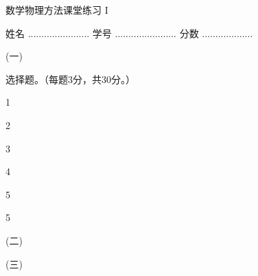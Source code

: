 \documentclass[12pt,CJK]{article}
\begin{document}
\bch
{\large 数学物理方法课堂练习 I}


姓名 ....................... {\hskip 0.5in}    学号 .......................{\hskip 0.5in}  分数 ...................

\bitem
\item[(一)]{选择题。（每题3分，共30分。）

  \bitem
\item[1]{}
\item[2]{}
\item[3]{}
\item[4]{}
\item[5]{}
\item[5]{}      
  \eitem
  }
\item[(二)]{


    \vspace{2.3in}
  }

\item[(三)]{
}
\eitem


\ech
\end{document}
